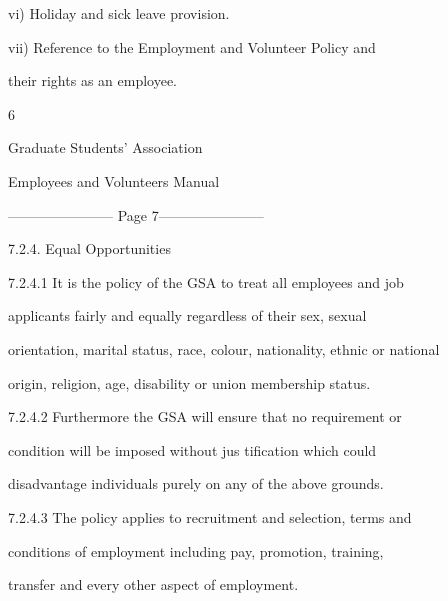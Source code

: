                   vi)       Holiday and sick leave provision.  



                  vii)      Reference to the Employment and Volunteer Policy and  

                            their rights as an employee. 



                                                   6  

  

                              Graduate Students’ Association  

                            Employees and Volunteers Manual  


----------------------- Page 7-----------------------

          7.2.4. Equal Opportunities  



7.2.4.1  It   is   the   policy   of   the   GSA   to   treat   all   employees   and  job  

          applicants        fairly      and     equally       regardless        of    their      sex,     sexual  

          orientation,  marital  status,  race,  colour, nationality,  ethnic  or  national  

          origin, religion, age, disability or union membership status.  



  



7.2.4.2  Furthermore    the    GSA    will    ensure    that    no    requirement    or   

          condition      will      be   imposed   without  jus tification   which   could  

          disadvantage individuals purely on any of the above grounds.  



  



7.2.4.3 The   policy    applies   to   recruitment    and    selection,   terms    and   

          conditions           of   employment            including   pay,   promotion,   training,  

         transfer and every other aspect of employment.  



  



